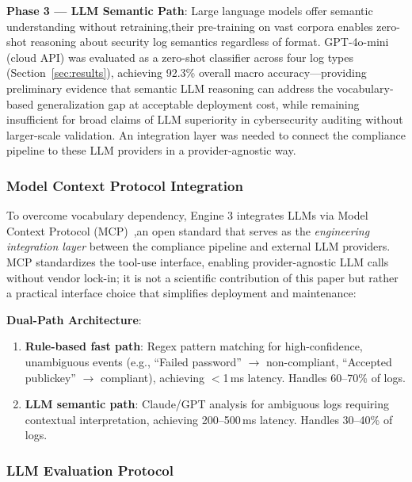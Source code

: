 \documentclass[futureinternet,article,submit,pdftex,moreauthors]{Definitions/mdpi}
\begin{document}
\textbf{Phase 3 — LLM Semantic Path}: Large language models offer semantic understanding
without retraining,their pre-training on vast corpora enables zero-shot reasoning about
security log semantics regardless of format. GPT-4o-mini (cloud API) was evaluated as a zero-shot classifier across four log types
(Section~\ref{sec:results}), achieving 92.3\% overall macro accuracy---providing
preliminary evidence that semantic LLM reasoning can address the vocabulary-based
generalization gap at acceptable deployment cost, while remaining insufficient for broad
claims of LLM superiority in cybersecurity auditing without larger-scale validation. An integration layer was needed to connect the
compliance pipeline to these LLM providers in a provider-agnostic way.

\subsubsection{Model Context Protocol Integration}

To overcome vocabulary dependency, Engine 3 integrates LLMs via Model Context
Protocol (MCP)~\cite{mcp_anthropic,mcp_spec},an open standard that serves as the
\textit{engineering integration layer} between the compliance pipeline and external LLM
providers. MCP standardizes the tool-use interface, enabling provider-agnostic LLM calls
without vendor lock-in; it is not a scientific contribution of this paper but rather
a practical interface choice that simplifies deployment and maintenance:

\textbf{Dual-Path Architecture}:
\begin{enumerate}
\item \textbf{Rule-based fast path}: Regex pattern matching for high-confidence, unambiguous
events (e.g., ``Failed password'' $\rightarrow$ non-compliant, ``Accepted publickey''
$\rightarrow$ compliant), achieving ${<}$1\,ms latency. Handles 60--70\% of logs.
\item \textbf{LLM semantic path}: Claude/GPT analysis for ambiguous logs requiring contextual
interpretation, achieving 200--500\,ms latency. Handles 30--40\% of logs.
\end{enumerate}

\subsubsection{LLM Evaluation Protocol}
\end{document}
